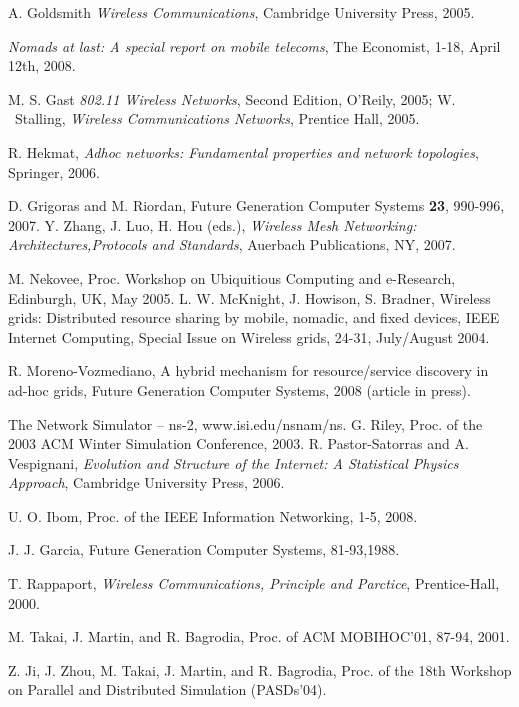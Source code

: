 \documentclass{elsart}
\begin{document}
\begin{thebibliography}{40}
A. Goldsmith {\it Wireless Communications}, Cambridge University Press, 2005.

{\it Nomads at last: A special report on mobile telecoms}, The Economist,
1-18, April 12th, 2008.

M. S. Gast {\it 802.11 Wireless Networks}, Second Edition, O'Reily, 2005;
W. ~Stalling, {\em Wireless Communications Networks}, Prentice Hall, 2005.

R. Hekmat, {\em Adhoc networks: Fundamental properties and network 
topologies}, Springer, 2006.

D. Grigoras and M. Riordan, Future Generation Computer Systems {\bf 23},
990-996, 2007.
Y. Zhang, J. Luo, H. Hou (eds.), {\it Wireless Mesh Networking: 
Architectures,Protocols and Standards}, Auerbach Publications, NY, 2007.

 M. Nekovee, Proc. Workshop on  Ubiquitious Computing and e-Research, 
Edinburgh, UK, May 2005.
L. W. McKnight, J. Howison, S. Bradner, Wireless grids: Distributed resource 
sharing by mobile, nomadic, and fixed devices, IEEE Internet Computing,
Special Issue on Wireless grids, 24-31, July/August 2004.

R. Moreno-Vozmediano, A hybrid mechanism for resource/service discovery in 
ad-hoc grids, Future Generation Computer Systems, 2008 (article in press).

The Network Simulator -- ns-2, www.isi.edu/nsnam/ns.
G. Riley, Proc. of the 2003 ACM Winter Simulation Conference, 2003.
R. Pastor-Satorras and A. Vespignani, {\it Evolution and Structure of the Internet: A Statistical Physics Approach}, Cambridge University Press, 2006.

U. O. Ibom, Proc. of the IEEE Information Networking, 1-5, 2008.

J. J. Garcia, Future Generation Computer Systems, 81-93,1988.

T. Rappaport, {\it Wireless Communications, Principle and Parctice}, 
Prentice-Hall, 2000.

M. Takai, J. Martin, and R. Bagrodia, Proc. of ACM MOBIHOC'01, 87-94, 2001.

Z. Ji, J. Zhou, M. Takai, J. Martin, and R. Bagrodia, Proc. of the 18th Workshop on Parallel and Distributed Simulation (PASDs'04). 


\end{thebibliography}
\end{document}
